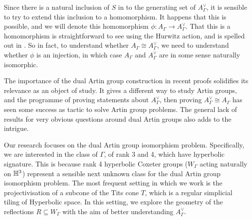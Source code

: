 Since there is a natural inclusion of $S$ in to the generating set of  $A^\vee_\Gamma$, it is sensible to try to extend this inclusion to a homomorphism.
It happens that this is possible, and we will denote this homomorphism $\phi \colon A_\Gamma \to A^\vee_\Gamma$.
That this is a homomorphism is straightforward to see using the Hurwitz action, and is spelled out in \cite[Proposition 10.1]{mccammond_sulway_artin_2017}.
So in fact, to understand whether $A_\Gamma \cong A^\vee_\Gamma$, we need to understand whether $\phi$ is an injection, in which case $A_\Gamma$ and  $A^\vee_\Gamma$ are in some sense naturally isomorphic.

The importance of the dual Artin group construction in recent proofs solidifies its relevance as an object of study.
It gives a different way to study Artin groups, and the programme of proving statements about $A^\vee_\Gamma$, then proving  $A^\vee_\Gamma \cong A_\Gamma$ has seen some success as tactic to solve Artin group problems.
The general lack of results for very obvious questions around dual Artin groups also adds to the intrigue.

Our research focuses on the dual Artin group isomorphism problem.
Specifically, we are interested in the class of $\Gamma$, of rank 3 and 4, which have hyperbolic signature.
This is because rank 4  hyperbolic Coxeter groups ($W_\Gamma$ acting naturally on $\mathbb{H}^3$) represent a sensible next unknown class for the dual Artin group isomorphism problem.
The most frequent setting in which we work is the projectivisation of a subcone of the Tits cone $T$, which is a regular simplicial tiling of Hyperbolic space.
In this setting, we explore the geometry of the reflections $R \subseteq W_\Gamma$ with the aim of better understanding  $A^\vee_\Gamma$.

